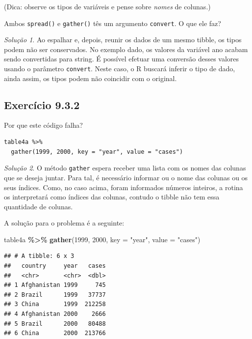 \documentclass[
]{latex/krantz}
\newenvironment{Shaded}{\begin{snugshade}}{\end{snugshade}}
\newcommand{\AttributeTok}[1]{\textcolor[rgb]{0.13,0.29,0.53}{#1}}
\newcommand{\FunctionTok}[1]{\textcolor[rgb]{0.13,0.29,0.53}{\textbf{#1}}}
\newcommand{\NormalTok}[1]{#1}
\newcommand{\SpecialCharTok}[1]{\textcolor[rgb]{0.81,0.36,0.00}{\textbf{#1}}}
\newcommand{\StringTok}[1]{\textcolor[rgb]{0.31,0.60,0.02}{#1}}
\theoremstyle{definition}
\theoremstyle{definition}
\theoremstyle{definition}
\theoremstyle{definition}
\theoremstyle{remark}
\newtheorem*{solution}{Solução}
\begin{document}
(Dica: observe os tipos de variáveis e pense sobre \emph{nomes} de colunas.)

Ambos \texttt{spread()} e \texttt{gather()} tês um argumento \texttt{convert}. O que ele faz?

\begin{solution}
Ao espalhar e, depois, reunir os dados de um mesmo tibble, os tipos podem não ser conservados. No exemplo dado, os valores da variável ano acabam sendo convertidas para string. É possível efetuar uma conversão desses valores usando o parâmetro \texttt{convert}. Neste caso, o R buscará inferir o tipo de dado, ainda assim, os tipos podem não coincidir com o original.
\end{solution}

\hypertarget{exr9-3-2}{%
\subsection*{Exercício 9.3.2}\label{exr9-3-2}}

Por que este código falha?

\begin{verbatim}
table4a %>%
  gather(1999, 2000, key = "year", value = "cases")
\end{verbatim}

\begin{solution}

O método \texttt{gather} espera receber uma lista com os nomes das colunas que se deseja juntar. Para tal, é necessário informar ou o nome das colunas ou os seus índices. Como, no caso acima, foram informados números inteiros, a rotina os interpretará como índices das colunas, contudo o tibble não tem essa quantidade de colunas.

A solução para o problema é a seguinte:

\begin{Shaded}
\begin{Highlighting}[]
\NormalTok{table4a }\SpecialCharTok{\%\textgreater{}\%}
  \FunctionTok{gather}\NormalTok{(}\StringTok{\textasciigrave{}}\AttributeTok{1999}\StringTok{\textasciigrave{}}\NormalTok{, }\StringTok{\textasciigrave{}}\AttributeTok{2000}\StringTok{\textasciigrave{}}\NormalTok{, }\AttributeTok{key =} \StringTok{"year"}\NormalTok{, }\AttributeTok{value =} \StringTok{"cases"}\NormalTok{)}
\end{Highlighting}
\end{Shaded}

\begin{verbatim}
## # A tibble: 6 x 3
##   country     year   cases
##   <chr>       <chr>  <dbl>
## 1 Afghanistan 1999     745
## 2 Brazil      1999   37737
## 3 China       1999  212258
## 4 Afghanistan 2000    2666
## 5 Brazil      2000   80488
## 6 China       2000  213766
\end{verbatim}

\end{solution}
\end{document}
